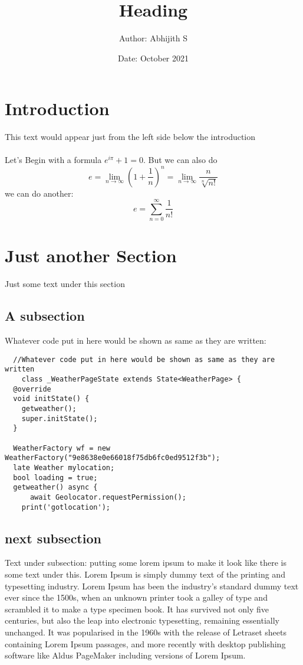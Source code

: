 \documentclass{article}     %
\title{Heading}             %
\author{Author: Abhijith S} %
\date{Date: October 2021}   %
\begin{document}

\maketitle

\section{Introduction}

This text would appear just from the left side below the introduction\\\\
Let's Begin with a formula $e^{i\pi}+1 = 0$. 
\newline
But we can also do 
$$e =  \lim_{n\to\infty}\left(1+ \frac{1}{n}\right)^n = \lim_{n\to\infty}\frac{n}{\sqrt[n]{n!}}$$
we can do another: $$e = \sum_{n=0}^{\infty}\frac{1}{n!}$$

\section{Just another Section}
     Just some text under this section 
     \subsection{A subsection}
Whatever code put in here would be shown as same as they are written:

\begin{verbatim}
  //Whatever code put in here would be shown as same as they are written
    class _WeatherPageState extends State<WeatherPage> {
  @override
  void initState() {
    getweather();
    super.initState();
  }

  WeatherFactory wf = new WeatherFactory("9e8638e0e66018f75db6fc0ed9512f3b");
  late Weather mylocation;
  bool loading = true;
  getweather() async {
      await Geolocator.requestPermission();
    print('gotlocation');
\end{verbatim}
\subsection{next subsection}
Text under subsection:  
putting some lorem ipsum to make it look like there is some text under this. 
Lorem Ipsum is simply dummy text of the printing and typesetting industry. 
Lorem Ipsum has been the industry's standard dummy text ever since the 1500s, 
when an unknown printer took a galley of type and scrambled it to make a type 
specimen book. It has survived not only five centuries, but also the leap into 
electronic typesetting, remaining essentially unchanged. It was popularised in 
the 1960s with the release of Letraset sheets containing Lorem Ipsum passages, 
and more recently with desktop publishing software like Aldus PageMaker 
including versions of Lorem Ipsum.
\end{document}
